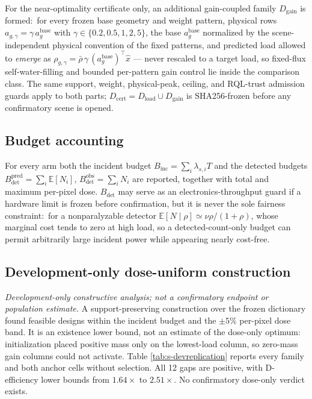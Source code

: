 \documentclass[10pt]{article}
\newcommand{\rhobar}{\bar{\rho}}
\begin{document}
For the near-optimality certificate only, an additional gain-coupled family
$D_{\mathrm{gain}}$ is formed:\ for every frozen base geometry and weight
pattern, physical rows $a_{g,\gamma} = \gamma\,a_g^{\mathrm{base}}$ with
$\gamma\in\{0.2,0.5,1,2,5\}$, the base $a_g^{\mathrm{base}}$ normalized by the
scene-independent physical convention of the fixed patterns, and predicted
load allowed to \emph{emerge} as
$\rho_{g,\gamma} = \rhobar\,\gamma\,(a_g^{\mathrm{base}})^{\top}\hat x$ ---
never rescaled to a target load, so fixed-flux self-water-filling and bounded
per-pattern gain control lie inside the comparison class. The same support,
weight, physical-peak, ceiling, and RQL-trust admission guards apply to both
parts; $D_{\mathrm{cert}} = D_{\mathrm{load}}\cup D_{\mathrm{gain}}$ is
SHA256-frozen before any confirmatory scene is opened.

\subsection{Budget accounting}
For every arm both the incident budget $B_{\mathrm{inc}} = \sum_i
\lambda_{s,i} T$ and the detected budgets $B_{\mathrm{det}}^{\mathrm{pred}}
= \sum_i \mathbb{E}[N_i]$, $B_{\mathrm{det}}^{\mathrm{obs}} = \sum_i N_i$
are reported, together with total and maximum per-pixel dose.
$B_{\mathrm{det}}$ may serve as an electronics-throughput guard if a
hardware limit is frozen before confirmation, but it is never the sole
fairness constraint:\ for a nonparalyzable detector
$\mathbb{E}[N\mid\rho]\simeq\nu\rho/(1+\rho)$, whose marginal cost tends to
zero at high load, so a detected-count-only budget can permit arbitrarily
large incident power while appearing nearly cost-free.

\subsection{Development-only dose-uniform construction}
\label{sec:s-dose-only}
\emph{Development-only constructive analysis; not a confirmatory endpoint or
population estimate.} A support-preserving construction over the frozen
dictionary found feasible designs within the incident budget and the
$\pm5\%$ per-pixel dose band. It is an existence lower bound, not an estimate
of the dose-only optimum: initialization placed positive mass only on the
lowest-load column, so zero-mass gain columns could not activate. Table
\ref{tab:s-devreplication} reports every family and both anchor cells without
selection. All 12 gaps are positive, with D-efficiency lower bounds from
$1.64\times$ to $2.51\times$. No confirmatory dose-only verdict exists.
\end{document}
